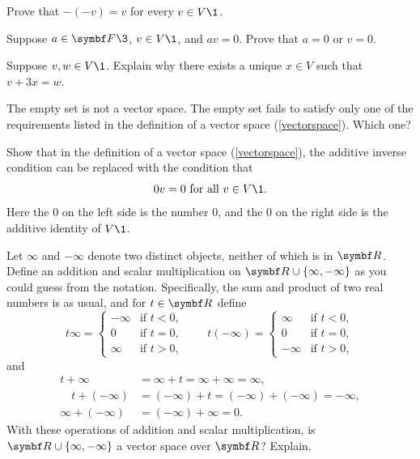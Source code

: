 \begin{exercises}

\exercise
Prove that $-(-v) = v$ for every $v \in V\1$.


\exercise
Suppose $a \in \F{}\3$, $v \in V\1$, and $av = 0$. Prove that $a = 0$ or $v = 0$.


\exercise
Suppose $v, w \in V\1$. Explain why there exists a unique $x \in V$ such that $v + 3x = w$.


\exercise
The empty set is not a vector space. The empty set fails to satisfy only one of the requirements listed in the definition of a vector space (\ref{vectorspace}). Which one?


\exercise
Show that in the definition of a vector space (\ref{vectorspace}), the additive inverse condition can be replaced with the condition that
\[
0v = 0 \text{ for all } v \in V\1.
\]
Here the $0$ on the left side is the number $0$, and the $0$ on the right side is the additive identity of $V\1$.


\exercise
Let $\infty$ and $-\infty$ denote two distinct objects, neither of which is in $\R{}$. Define an addition and scalar multiplication on
$\R{} \cup \{\infty, -\infty\}$ as you could guess from the notation. Specifically, the sum and product of two real numbers is as usual, and for
$t \in \R{}$ define
\vspace{-.08in}
\[
t \infty =
\begin{cases}
-\infty & \text{if } t < 0,\\
0 & \text{if } t = 0,\\
\infty & \text{if } t > 0,
\end{cases}
\quad\quad
t (-\infty) =
\begin{cases}
\infty & \text{if } t < 0,\\
0 & \text{if } t = 0,\\
-\infty & \text{if } t > 0,
\end{cases}
\]
and
\begin{align*}
t + \infty &= \infty + t = \infty + \infty = \infty,\\[-1bp]
\quad t + (-\infty) &= (-\infty) + t  = (-\infty) + (-\infty) = -\infty,\\[-1bp]
\infty + (-\infty) &= (-\infty) + \infty = 0.
\end{align*}
With these operations of addition and scalar multiplication, is $\R{} \cup \{\infty,-\infty\}$ a vector space over $\R{}$? Explain.



\end{exercises}
